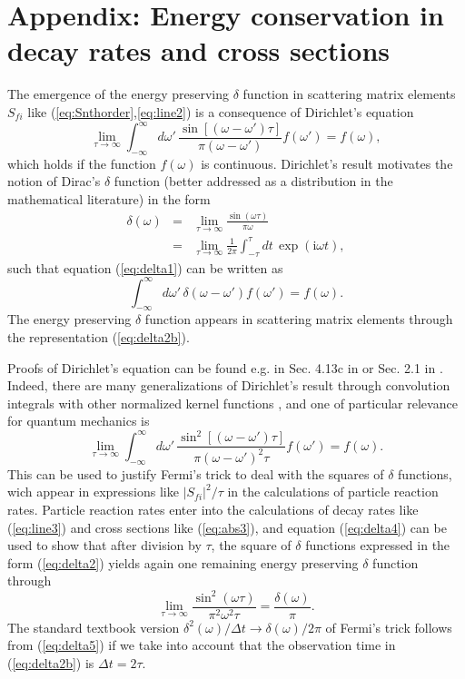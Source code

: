 \documentclass[final,3p,12pt]{elsarticle3}
\begin{document}
\section*{Appendix: Energy conservation in
decay rates and cross sections}
The emergence of the energy preserving $\delta$ function in scattering 
matrix elements $S_{\! fi}$ like (\ref{eq:Snthorder},\ref{eq:line2}) is a 
consequence of Dirichlet's equation \cite{CH,courant}
\begin{equation}\label{eq:delta1}
\lim_{\tau\to\infty}\int_{-\infty}^\infty\!d\omega'\,
\frac{\sin[(\omega-\omega')\tau]}{\pi(\omega-\omega')}f(\omega')
=f(\omega),
\end{equation}
which holds if the function $f(\omega)$ is continuous. Dirichlet's result 
motivates the notion of Dirac's $\delta$ function
(better addressed as a distribution in the mathematical
literature) in the form
\begin{eqnarray}\label{eq:delta2}
\delta(\omega)
&=&\lim_{\tau\to\infty}\frac{\sin(\omega\tau)}{\pi\omega}
\\ \label{eq:delta2b}
&=&\lim_{\tau\to\infty}\frac{1}{2\pi}\int_{-\tau}^{\tau}\!
dt\,\exp(\mathrm{i}\omega t),
\end{eqnarray}
such that equation (\ref{eq:delta1}) can 
be written as 
\begin{equation}\label{eq:delta3}
\int_{-\infty}^\infty\!d\omega'\,\delta(\omega-\omega')f(\omega')
=f(\omega).
\end{equation}
The energy preserving $\delta$ function appears in scattering matrix 
elements through the representation (\ref{eq:delta2b}).

Proofs of Dirichlet's equation can be found e.g. in Sec. 4.13c
in \cite{courant} or Sec. 2.1 in \cite{rdqm}. Indeed, there are
many generalizations of Dirichlet's result through convolution
integrals with other normalized kernel functions \cite{rdqm}, 
and one of particular relevance for quantum mechanics is
\begin{equation}\label{eq:delta4}
\lim_{\tau\to\infty}\int_{-\infty}^\infty\!d\omega'\,
\frac{\sin^2[(\omega-\omega')\tau]}{\pi(\omega-\omega')^2\tau}f(\omega')
=f(\omega).
\end{equation}
This can be used to justify Fermi's trick to deal with the squares
of $\delta$ functions, wich appear in expressions like $|S_{fi}|^2/\tau$
in the calculations of particle reaction rates.
Particle reaction rates enter into the
calculations of decay rates like (\ref{eq:line3}) and cross sections 
like (\ref{eq:abs3}), and equation (\ref{eq:delta4}) can be used to
show that after division by $\tau$, the square of $\delta$ functions 
expressed in the form (\ref{eq:delta2}) yields again one remaining energy 
preserving $\delta$ function through
\begin{equation}\label{eq:delta5}
\lim_{\tau\to\infty}\frac{\sin^2(\omega\tau)}{\pi^2\omega^2\tau}
=\frac{\delta(\omega)}{\pi}.
\end{equation}
The standard textbook 
version $\delta^2(\omega)/\Delta t\to\delta(\omega)/2\pi$ of Fermi's 
trick follows from (\ref{eq:delta5}) if we take into account that the
observation time in  (\ref{eq:delta2b}) is $\Delta t=2\tau$.
\end{document}

